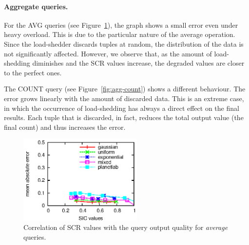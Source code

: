 \paragraph{Aggregate queries.}
For the \textnormal{AVG} queries (see Figure~\ref{fig:agg-avg}), the graph shows a small error even
under heavy overload. This is due to the particular nature of the average operation. Since the
load-shedder discards tuples at random, the distribution of the data is not significantly affected. 
However, we observe that, as the amount of \mbox{load-shedding} diminishes and the SCR values increase,
the degraded values are closer to the perfect ones.

The \textnormal{COUNT} query (see Figure~\ref{fig:agg-count}) shows a different behaviour. The error
grows linearly with the amount of discarded data. This is an extreme case, in which the occurrence of
\mbox{load-shedding} has always a direct effect on the final results. Each tuple that is discarded, in fact,
reduces the total output value (\ie the final count) and thus increases the error.
\vspace{15pt}
\begin{figure}[h!]
\centering
\includegraphics[width=0.55\textwidth]{img/tesi/avg1}
\caption{Correlation of SCR values with the query output quality for \emph{average} queries.}
\label{fig:agg-avg}
\end{figure} 
\clearpage

